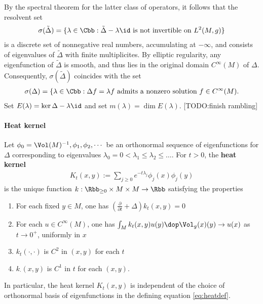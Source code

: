 By the spectral theorem for the latter class of operators, it follows that the resolvent set
\begin{align*}
    \sigma(\tilde{\Delta}) = \{ \lambda \in \Cbb : \tilde{\Delta} - \lambda \id \text{ is not invertible on $L^2(M,g)$}\}
\end{align*}
is a discrete set of nonnegative real numbers, accumulating at $-\infty$, and consists of eigenvalues of $\tilde{\Delta}$ with finite multiplicites. By elliptic regularity, any eigenfunction of $\tilde{\Delta}$ is smooth, and thus lies in the original domain $C^\infty(M)$ of $\Delta$. Consequently, $\sigma(\tilde{\Delta})$ coincides with the set
\begin{align*}
    \sigma(\Delta) = \{\lambda \in \Cbb : \Delta f  = \lambda f \text{ admits a nonzero  solution  $f \in C^\infty(M)$}.
\end{align*}
Set $E(\lambda) = \ker \Delta - \lambda \id$ and set $m(\lambda) = \dim E(\lambda)$. [TODO:finish rambling]

\paragraph{Heat kernel}
Let $\phi_0=\Vol(M)^{-1},\phi_1,\phi_2,\cdots$ be an orthonormal sequence of eigenfunctions for $\Delta$ corresponding to eigenvalues $\lambda_0=0 <\lambda_1 \leq \lambda_2 \leq \dots$. For $t >0$, the \textbf{heat kernel}
\begin{align}\label{eq:heatdef}
    K_t(x,y):= \sum_{j\geq 0} e^{-t\lambda_j} \phi_j(x)\phi_j(y)
\end{align}
is the unique function $k:\Rbb_{\geq 0} \times M \times M \to \Rbb$ satisfying the properties
\begin{enumerate}
    \item For each fixed $y\in M$, one has $\left(\frac{\partial}{\partial t} + \Delta \right)k_t(x,y) = 0$
    \item For each $u\in C^\infty(M)$, one has $ \int_M k_t(x,y) u(y)  \dop \Vol_g (x)(y) \to u(x)$  as $t \to 0^+$, uniformly in $x$
    \item $k_t(\cdot,\cdot)$ is $C^2$ in $(x,y)$ for each $t$
    \item $k_\cdot( x,y)$ is $C^1$  in $t$ for each $(x,y)$.
\end{enumerate}
In particular, the heat kernel $K_t(x,y)$ is independent of the choice of orthonormal basis of eigenfunctions in the defining equation \ref{eq:heatdef}.


